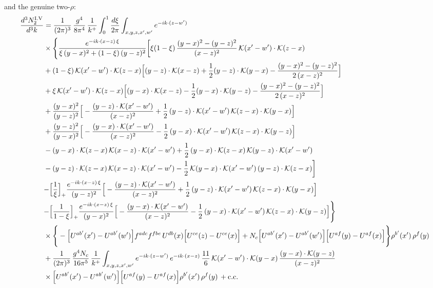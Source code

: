\documentclass[9pt]{article}
\numberwithin{equation}{section}
\begin{document}
and the genuine two-$\rho$:
\begin{align}
\frac{d^{3}N^{\rm I.V}_{2}}{d^{3}k} & =\frac{1}{(2\pi)^{3}}\,\frac{g^{4}}{8\pi^{4}}\,\frac{1}{k^{+}}\int_{0}^{1}\frac{d\xi}{2\pi}\int_{x,y,z,x',w'}e^{-ik\cdot(z-w')}\notag\\
&\times\Bigg\{\frac{e^{-ik\cdot(x-z)\,\xi}}{\xi\,(y-x)^{2}+(1-\xi)\,(y-z)^{2}}\bigg[\xi(1-\xi)\,\frac{(y-x)^{2}-(y-z)^{2}}{(x-z)^{2}}\,\mathcal{K}(x'-w')\cdot\mathcal{K}(z-x)\notag\\
&+(1-\xi)\,\mathcal{K}(x'-w')\cdot\mathcal{K}(z-x)\Big[(y-z)\cdot\mathcal{K}(x-z)+\frac{1}{2}(y-z)\cdot\mathcal{K}(y-x)-\frac{(y-x)^{2}-(y-z)^{2}}{2\,(x-z)^{2}}\Big]\notag\\
&+\xi\,\mathcal{K}(x'-w')\cdot\mathcal{K}(z-x)\Big[(y-x)\cdot\mathcal{K}(x-z)-\frac{1}{2}(y-x)\cdot\mathcal{K}(y-z)-\frac{(y-x)^{2}-(y-z)^{2}}{2\,(x-z)^{2}}\Big]\notag\\
&+\frac{(y-x)^{2}}{(y-z)^{2}}\Big[-\frac{(y-z)\cdot\mathcal{K}(x'-w')}{(x-z)^{2}}+\frac{1}{2}\,(y-z)\cdot\mathcal{K}(x'-w')\,\mathcal{K}(z-x)\cdot\mathcal{K}(y-x)\Big]\notag\\
&+\frac{(y-z)^{2}}{(y-x)^{2}}\Big[-\frac{(y-x)\cdot\mathcal{K}(x'-w')}{(x-z)^{2}}-\frac{1}{2}\,(y-x)\cdot\mathcal{K}(x'-w')\,\mathcal{K}(z-x)\cdot\mathcal{K}(y-z)\Big]\notag\\
&-(y-x)\cdot\mathcal{K}(z-x)\,\mathcal{K}(x-z)\cdot\mathcal{K}(x'-w')+\frac{1}{2}\,(y-x)\cdot\mathcal{K}(z-x)\,\mathcal{K}(y-z)\cdot\mathcal{K}(x'-w')\notag\\
&-(y-z)\cdot\mathcal{K}(z-x)\,\mathcal{K}(x-z)\cdot\mathcal{K}(x'-w')-\frac{1}{2}\,\mathcal{K}(y-x)\cdot\mathcal{K}(x'-w')\,(y-z)\cdot\mathcal{K}(z-x)\bigg]\notag\\
&{-\Big[\frac{1}{\xi}\Big]_{+}\frac{e^{-ik\cdot(x-z)\,\xi}}{(y-z)^{2}}\Big[-\frac{(y-z)\cdot\mathcal{K}(x'-w')}{(x-z)^{2}}+\frac{1}{2}\,(y-z)\cdot\mathcal{K}(x'-w')\,\mathcal{K}(z-x)\cdot\mathcal{K}(y-x)\Big]}\notag\\
&{-\Big[\frac{1}{1-\xi}\Big]_{+}\frac{e^{-ik\cdot(x-z)\,\xi}}{(y-x)^{2}}\Big[-\frac{(y-x)\cdot\mathcal{K}(x'-w')}{(x-z)^{2}}-\frac{1}{2}\,(y-x)\cdot\mathcal{K}(x'-w')\,\mathcal{K}(z-x)\cdot\mathcal{K}(y-z)\Big]}\Bigg\}\notag\\
&\times\Bigg\{-\Big[U^{ab'}(x')-U^{ab'}(w')\Big]f^{adc}f^{fbe}\,U^{db}(x)\Big[U^{ce}(z)-U^{ce}(x)\Big]+N_{c}\Big[U^{ab'}(x')-U^{ab'}(w')\Big]\Big[U^{af}(y)-U^{af}(x)\Big]\Bigg\}\rho^{b'}(x')\,\rho^{f}(y)\notag\\
&+\frac{1}{(2\pi)^{3}}\,\frac{g^{4}N_{c}}{16\pi^{5}}\,\frac{1}{k^{+}}\int_{x,y,z,x',w'}e^{-ik\cdot(z-w')}\,e^{-ik\cdot(x-z)}\,\frac{11}{6}\,\mathcal{K}(x'-w')\cdot\mathcal{K}(y-x)\,\frac{(y-x)\cdot\mathcal{K}(y-z)}{(x-z)^{2}}\notag\\
&\times\Big[U^{ab'}(x')-U^{ab'}(w')\Big]\Big[U^{af}(y)-U^{af}(x)\Big]\rho^{b'}(x')\,\rho^{f}(y)\,+ {\rm c.c.}
\label{eq:H-I.V-2o}
\end{align}
\end{document}
